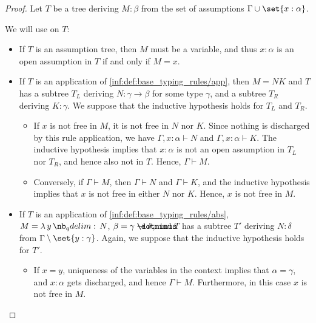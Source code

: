 \begin{proof}
   Let \( T \) be a tree deriving \( M: \beta \) from the set of assumptions \( \Gamma \cup \set{ x: \alpha } \).

  We will use  on \( T \):
  \begin{itemize}
    \item If \( T \) is an assumption tree, then \( M \) must be a variable, and thus \( x: \alpha \) is an open assumption in \( T \) if and only if \( M = x \).

    \item If \( T \) is an application of \ref{inf:def:base_typing_rules/app}, then \( M = NK \) and \( T \) has a subtree \( T_L \) deriving \( N: \gamma \to \beta \) for some type \( \gamma \), and a subtree \( T_R \) deriving \( K: \gamma \). We suppose that the inductive hypothesis holds for \( T_L \) and \( T_R \).

    \begin{itemize}
      \item If \( x \) is not free in \( M \), it is not free in \( N \) nor \( K \). Since nothing is discharged by this rule application, we have \( \Gamma, x: \alpha \vdash N \) and \( \Gamma, x: \alpha \vdash K \). The inductive hypothesis implies that \( x: \alpha \) is not an open assumption in \( T_L \) nor \( T_R \), and hence also not in \( T \). Hence, \( \Gamma \vdash M \).

      \item Conversely, if \( \Gamma \vdash M \), then \( \Gamma \vdash N \) and \( \Gamma \vdash K \), and the inductive hypothesis implies that \( x \) is not free in either \( N \) nor \( K \). Hence, \( x \) is not free in \( M \).
    \end{itemize}

    \item If \( T \) is an application of \ref{inf:def:base_typing_rules/abs}, \( M = \qabs y N \), \( \beta = \gamma \synimplies \delta \), and \( T \) has a subtree \( T' \) deriving \( N: \delta \) from \( \Gamma \setminus \set{ y: \gamma } \). Again, we suppose that the inductive hypothesis holds for \( T' \).

    \begin{itemize}
      \item If \( x = y \), uniqueness of the variables in the context implies that \( \alpha = \gamma \), and \( x: \alpha \) gets discharged, and hence \( \Gamma \vdash M \). Furthermore, in this case \( x \) is not free in \( M \).


\end{itemize}
\end{itemize}
\end{proof}
